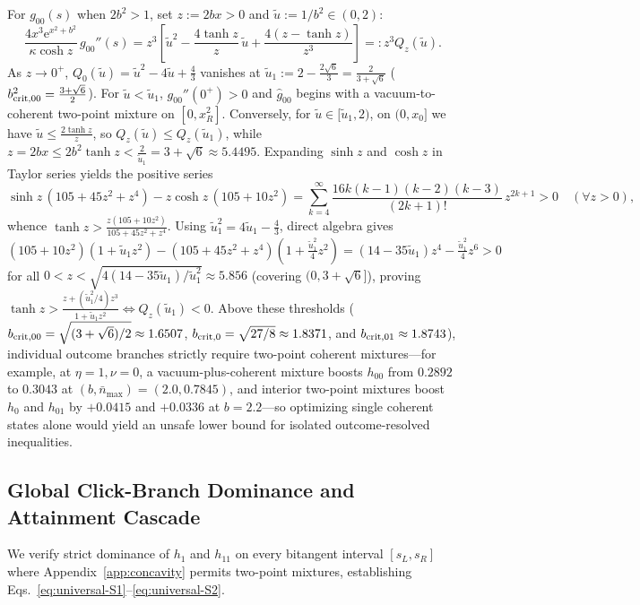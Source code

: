 \documentclass{iopjournal}
\newcommand{\nbar}{\bar n_{\max}}
\newcommand{\ee}{\mathrm{e}}
\begin{document}
For $g_{00}(s)$ when $2b^2 > 1$, set $z := 2bx > 0$ and $\tilde u := 1/b^2 \in (0,2)$:
\begin{equation}\label{eq:Qz-def}
\frac{4x^3 \ee^{x^2+b^2}}{\kappa\cosh z}\,g_{00}''(s) = z^3\left[\tilde u^2 - \frac{4\tanh z}{z}\,\tilde u + \frac{4(z-\tanh z)}{z^3}\right] =: z^3 Q_z(\tilde u).
\end{equation}
As $z \to 0^+$, $Q_0(\tilde u) = \tilde u^2 - 4\tilde u + \frac{4}{3}$ vanishes at $\tilde u_1 := 2 - \frac{2\sqrt{6}}{3} = \frac{2}{3+\sqrt{6}}$ ($b_{\rm crit,00}^2 = \frac{3+\sqrt{6}}{2}$). For $\tilde u < \tilde u_1$, $g_{00}''(0^+) > 0$ and $\widehat{g}_{00}$ begins with a vacuum-to-coherent two-point mixture on $[0, x_R^2]$. Conversely, for $\tilde u \in [\tilde u_1, 2)$, on $(0, x_0]$ we have $\tilde u \le \frac{2\tanh z}{z}$, so $Q_z(\tilde u) \le Q_z(\tilde u_1)$, while $z = 2bx \le 2b^2\tanh z < \frac{2}{\tilde u_1} = 3 + \sqrt{6} \approx 5.4495$. Expanding $\sinh z$ and $\cosh z$ in Taylor series yields the positive series
\begin{equation}\label{eq:sinh-pade}
\sinh z\,(105 + 45z^2 + z^4) - z\cosh z\,(105 + 10z^2) = \sum_{k=4}^\infty \frac{16k(k-1)(k-2)(k-3)}{(2k+1)!}\,z^{2k+1} > 0 \quad (\forall z > 0),
\end{equation}
whence $\tanh z > \frac{z(105+10z^2)}{105+45z^2+z^4}$. Using $\tilde u_1^2 = 4\tilde u_1 - \frac{4}{3}$, direct algebra gives $(105+10z^2)(1+\tilde u_1 z^2) - (105+45z^2+z^4)(1+\frac{\tilde u_1^2}{4}z^2) = (14 - 35\tilde u_1)z^4 - \frac{\tilde u_1^2}{4}z^6 > 0$ for all $0 < z < \sqrt{4(14-35\tilde u_1)/\tilde u_1^2} \approx 5.856$ (covering $(0, 3+\sqrt{6}]$), proving $\tanh z > \frac{z+(\tilde u_1^2/4)z^3}{1+\tilde u_1 z^2} \iff Q_z(\tilde u_1) < 0$. Above these thresholds ($b_{\rm crit,00} = \sqrt{(3+\sqrt{6})/2} \approx 1.6507$, $b_{\rm crit,0} = \sqrt{27/8} \approx 1.8371$, and $b_{\rm crit,01} \approx 1.8743$), individual outcome branches strictly require two-point coherent mixtures---for example, at $\eta=1,\nu=0$, a vacuum-plus-coherent mixture boosts $h_{00}$ from $0.2892$ to $0.3043$ at $(b,\nbar)=(2.0, 0.7845)$, and interior two-point mixtures boost $h_0$ and $h_{01}$ by $+0.0415$ and $+0.0336$ at $b=2.2$---so optimizing single coherent states alone would yield an unsafe lower bound for isolated outcome-resolved inequalities.

\subsection{Global Click-Branch Dominance and Attainment Cascade}\label{app:universal}
We verify strict dominance of $h_1$ and $h_{11}$ on every bitangent interval $[s_L, s_R]$ where Appendix~\ref{app:concavity} permits two-point mixtures, establishing Eqs.~\eqref{eq:universal-S1}--\eqref{eq:universal-S2}.
\end{document}
